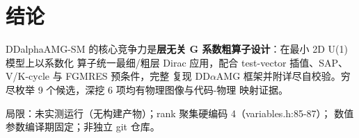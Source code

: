 \documentclass[UTF8]{ctexart}
\begin{document}
\section{结论}
\begin{conclbox}
DDalphaAMG-SM 的核心竞争力是\textbf{层无关 G 系数粗算子设计}：在最小 2D U(1) 模型上以系数化
算子统一最细/粗层 Dirac 应用，配合 test-vector 插值、SAP、V/K-cycle 与 FGMRES 预条件，完整
复现 DD$\alpha$AMG 框架并附详尽自校验。穷尽枚举 9 个候选，深挖 6 项均有物理图像与代码-物理
映射证据。
\end{conclbox}
\begin{warnbox}
\textcolor{warn}{局限：}未实测运行（无构建产物）；rank 聚集硬编码 4（variables.h:85-87）；
数值参数编译期固定；非独立 git 仓库。
\end{warnbox}
\end{document}

